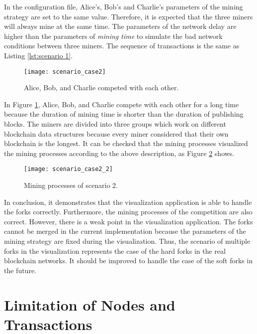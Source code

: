In the configuration file, Alice's, Bob's and Charlie's parameters of the mining strategy are set to the same value. Therefore, it is expected that the three miners will always mine at the same time. The parameters of the network delay are higher than the parameters of \textit{mining time} to simulate the bad network conditions between three miners. The sequence of transactions is the same as Listing \ref{lst:scenario 1}.

\begin{figure}[htb]
    \centering
    \texttt{[image: scenario\_case2]}
    \caption{Alice, Bob, and Charlie competed with each other.}
    \label{fig:alice, bob, and charlie competed with each other}
\end{figure}

In Figure \ref{fig:alice, bob, and charlie competed with each other}, Alice, Bob, and Charlie compete with each other for a long time because the duration of mining time is shorter than the duration of publishing blocks. The miners are divided into three groups which work on different blockchain data structures because every miner considered that their own blockchain is the longest. It can be checked that the mining processes visualized the mining processes according to the above description, as Figure \ref{fig:mining processes of scenario 2} shows.

\begin{figure}[htb]
    \centering
    \texttt{[image: scenario\_case2\_2]}
    \caption{Mining processes of scenario 2.}
    \label{fig:mining processes of scenario 2}
\end{figure}

In conclusion, it demonstrates that the visualization application is able to handle the forks correctly. Furthermore, the mining processes of the competition are also correct. However, there is a weak point in the visualization application. The forks cannot be merged in the current implementation because the parameters of the mining strategy are fixed during the visualization. Thus, the scenario of multiple forks in the visualization represents the case of the hard forks in the real blockchain networks. It should be improved to handle the case of the soft forks in the future.

\section{Limitation of Nodes and Transactions}


